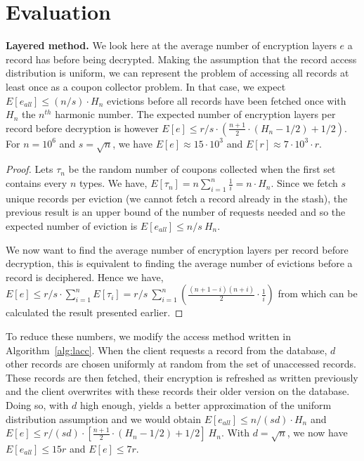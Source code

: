 \documentclass[USenglish,oneside,twocolumn]{article}
\begin{document}
\section{Evaluation}\label{Evaluation}
\textbf{Layered method.} We look here at the average number of encryption layers $e$ a record has before being decrypted. Making the assumption that the record access distribution is uniform, we can represent the problem of accessing all records at least once as a coupon collector problem. In that case, we expect $E[e_{all}]\leq(n/s)\cdot H_n$ evictions before all records have been fetched once with $H_n$ the $n^{th}$ harmonic number. The expected number of encryption layers per record before decryption is however $E[e]\leq{r/s} \cdot \left ( \frac{n+1}{2}\cdot(H_n-1/2)+1/2 \right )$. For $n=10^6$ and $s=\sqrt{n}$, we have $E[e]\approx 15 \cdot 10^3$ and $E[r]\approx 7\cdot 10^3 \cdot r$.
\begin{proof}
Lets $\tau_n$ be the random number of coupons collected when the first set contains every $n$ types. We have, $E[\tau_n]=n\sum_{i=1}^n \frac{1}{i} = n \cdot H_n$.
Since we fetch $s$ unique records per eviction (we cannot fetch a record already in the stash), the previous result is an upper bound of the number of requests needed and so the expected number of eviction is $E[e_{all}]\leq n/s\ H_n$.

We now want to find the average number of encryption layers per record before decryption, this is equivalent to finding the average number of evictions before a record is deciphered. 
Hence we have, $E[e]\leq r/s \cdot \sum_{i=1}^n E[\tau_i] = r/s\ \sum_{i=1}^n \left (\frac{(n+1-i)(n+i)}{2}\cdot \frac{1}{i}\right )$ from which can be calculated the result presented earlier. 
\end{proof}

To reduce these numbers, we modify the access method written in Algorithm~\ref{alg:lacc}. When the client requests a record from the database, $d$ other records are chosen uniformly at random from the set of unaccessed records. These records are then fetched, their encryption is refreshed as written previously and the client overwrites with these records their older version on the database. Doing so, with $d$ high enough, yields a better approximation of the uniform distribution assumption and we would obtain  $E[e_{all}]\leq n/(sd) \cdot H_n $ and $E[e] \leq {r/(sd)} \cdot \left [ \frac{n+1}{2}\cdot(H_n-1/2)+1/2 \right ] \ H_n$.
With $d=\sqrt n$, we now have $E[e_{all}]\leq 15 r$ and $E[e]\leq 7r$.
\end{document}
